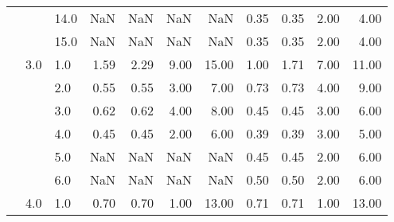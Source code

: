 \begin{tabular}{lllrrrrrrrr}
      &     & 14.0 &        NaN &       NaN &  NaN &    NaN &       0.35 &      0.35 & 2.00 &   4.00 \\
      &     & 15.0 &        NaN &       NaN &  NaN &    NaN &       0.35 &      0.35 & 2.00 &   4.00 \\
      & 3.0 & 1.0  &       1.59 &      2.29 & 9.00 &  15.00 &       1.00 &      1.71 & 7.00 &  11.00 \\
      &     & 2.0  &       0.55 &      0.55 & 3.00 &   7.00 &       0.73 &      0.73 & 4.00 &   9.00 \\
      &     & 3.0  &       0.62 &      0.62 & 4.00 &   8.00 &       0.45 &      0.45 & 3.00 &   6.00 \\
      &     & 4.0  &       0.45 &      0.45 & 2.00 &   6.00 &       0.39 &      0.39 & 3.00 &   5.00 \\
      &     & 5.0  &        NaN &       NaN &  NaN &    NaN &       0.45 &      0.45 & 2.00 &   6.00 \\
      &     & 6.0  &        NaN &       NaN &  NaN &    NaN &       0.50 &      0.50 & 2.00 &   6.00 \\
      & 4.0 & 1.0  &       0.70 &      0.70 & 1.00 &  13.00 &       0.71 &      0.71 & 1.00 &  13.00 \\
\bottomrule
\end{tabular}
